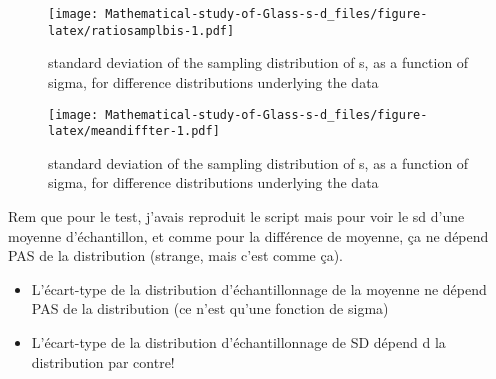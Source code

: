 \documentclass[
  man,floatsintext]{apa6}
\providecommand{\tightlist}{%
  \setlength{\itemsep}{0pt}\setlength{\parskip}{0pt}}
\begin{document}
\begin{figure}
\centering
\texttt{[image: Mathematical-study-of-Glass-s-d\_files/figure-latex/ratiosamplbis-1.pdf]}
\caption{\label{fig:ratiosamplbis}standard deviation of the sampling distribution of s, as a function of sigma, for difference distributions underlying the data}
\end{figure}

\begin{figure}
\centering
\texttt{[image: Mathematical-study-of-Glass-s-d\_files/figure-latex/meandiffter-1.pdf]}
\caption{\label{fig:meandiffter}standard deviation of the sampling distribution of s, as a function of sigma, for difference distributions underlying the data}
\end{figure}

Rem que pour le test, j'avais reproduit le script mais pour voir le sd d'une moyenne d'échantillon, et comme pour la différence de moyenne, ça ne dépend PAS de la distribution (strange, mais c'est comme ça).

\begin{itemize}
\tightlist
\item
  L'écart-type de la distribution d'échantillonnage de la moyenne ne dépend PAS de la distribution (ce n'est qu'une fonction de sigma)
\item
  L'écart-type de la distribution d'échantillonnage de SD dépend d la distribution par contre!
\end{itemize}
\end{document}
